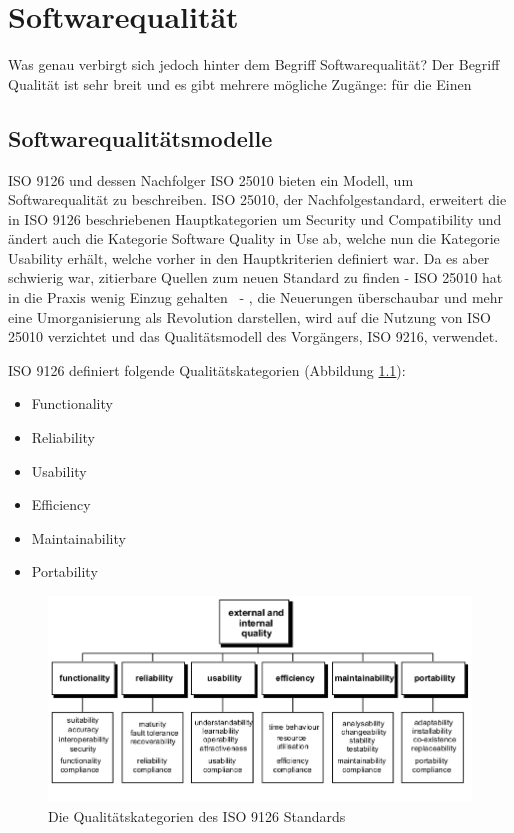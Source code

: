 \chapter{Softwarequalität}
Was genau verbirgt sich jedoch hinter dem Begriff Softwarequalität? Der Begriff Qualität ist sehr breit und es gibt mehrere mögliche Zugänge: für die Einen   \cite[S. 399-400]{pract}

\section{Softwarequalitätsmodelle}
ISO 9126 \cite{ISO_SQ} und dessen Nachfolger ISO 25010 \cite{ISO_SQ2} bieten ein Modell, um Softwarequalität zu beschreiben. ISO 25010, der Nachfolgestandard, erweitert die in ISO 9126 beschriebenen Hauptkategorien um Security und Compatibility und ändert auch die Kategorie Software Quality in Use ab, welche nun die Kategorie Usability erhält, welche vorher in den Hauptkriterien definiert war. Da es aber schwierig war, zitierbare Quellen zum neuen Standard zu finden - ISO 25010 hat \glqq in die Praxis wenig Einzug gehalten\grqq \ \cite[S. 60]{effektiv} - , die Neuerungen überschaubar und mehr eine Umorganisierung als Revolution darstellen, wird auf die Nutzung von ISO 25010 verzichtet und das Qualitätsmodell des Vorgängers, ISO 9216, verwendet.

ISO 9126 definiert folgende Qualitätskategorien (Abbildung \ref{fig:iso9126}):

\begin{itemize}
  \item \glqq Functionality\grqq
  \item \glqq Reliability\grqq
  \item \glqq Usability\grqq
  \item \glqq Efficiency\grqq
  \item \glqq Maintainability\grqq
  \item \glqq Portability\grqq
\end{itemize}

\begin{figure}[H]
    \centering
    \includegraphics[scale=0.54]{img/iso9126.png}
    \caption{Die Qualitätskategorien des ISO 9126 Standards\cite[S. 7]{ISO_SQ}}
    \label{fig:iso9126}
\end{figure}

